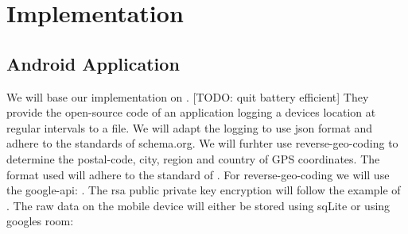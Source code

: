 \section{Implementation}
\subsection{Android Application}
We will base our implementation on \cite{gpsLogger}. [TODO: quit battery efficient] They provide the open-source code of an application logging a devices location at regular intervals to a file. We will adapt the logging to use json format and adhere to the standards of schema.org. We will furhter use reverse-geo-coding to determine the postal-code, city, region and country of GPS coordinates. The format used will adhere to the standard of \cite{schemaOrg}. For reverse-geo-coding we will use the google-api: \cite{googleApiReverseGeo}. The rsa public private key encryption will follow the example of \cite{rsa}. The raw data on the mobile device will either be stored using sqLite or using googles room: %